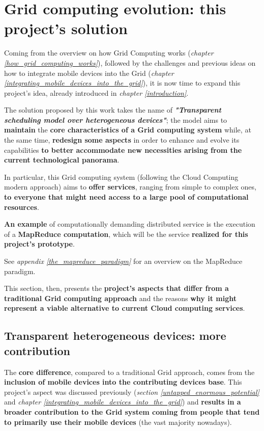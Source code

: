 \section{Grid computing evolution: this project's solution}
Coming from the overview on how Grid Computing works (\textit{chapter \ref{how_grid_computing_works}}), followed by the challenges and previous ideas on how to integrate mobile devices into the Grid (\textit{chapter \ref{integrating_mobile_devices_into_the_grid}}), it is now time to expand this project's idea, already introduced in \textit{chapter \ref{introduction}}.

The solution proposed by this work takes the name of \textbf{\textit{"Transparent scheduling model over heterogeneous devices"}}; the model aims to \textbf{maintain} the \textbf{core characteristics of a Grid computing system} while, at the same time, \textbf{redesign some aspects} in order to enhance and evolve its capabilities \textbf{to better accommodate new necessities arising from the current technological panorama}.

In particular, this Grid computing system (following the Cloud Computing modern approach) aims to \textbf{offer services}, ranging from simple to complex ones, \textbf{to everyone that might need access to a large pool of computational resources}.

\textbf{An example} of computationally demanding distributed service is the execution of a \textbf{MapReduce computation}, which will be the service \textbf{realized for this project's prototype}.

\begin{info}
    See \textit{appendix \ref{the_mapreduce_paradigm}} for an overview on the MapReduce paradigm.
\end{info}

This section, then, presents the \textbf{project's aspects that differ from a traditional Grid computing approach} and the reasons \textbf{why it might represent a viable alternative to current Cloud computing services}.

\subsection{Transparent heterogeneous devices: more contribution}\label{transparent_heterogeneous_devices_more_contribution}
The \textbf{core difference}, compared to a traditional Grid approach, comes from the \textbf{inclusion of mobile devices into the contributing devices base}.
This project's aspect was discussed previously (\textit{section \ref{untapped_enormous_potential}} and \textit{chapter \ref{integrating_mobile_devices_into_the_grid}}) and \textbf{results in a broader contribution to the Grid system coming from people that tend to primarily use their mobile devices} (the vast majority nowadays).

